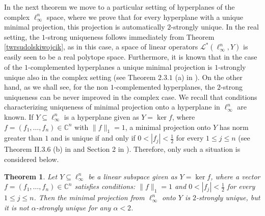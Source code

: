 \documentclass[12pt, reqno]{amsart}
\newtheorem{twr}{Theorem}[section]
\theoremstyle{definition}
\theoremstyle{remark}
\numberwithin{equation}{section}
\begin{document}
In the next theorem we move to a particular setting of hyperplanes of the complex $\ell_{\infty}^n$ space, where we prove that for every hyperplane with a unique minimal projection, this projection is automatically $2$-strongly unique. In the real setting, the $1$-strong uniqueness follows immediately from Theorem \ref{twrsudolskiwojcik}, as in this case, a space of linear operators $\mathcal{L}^* (\ell_{\infty}^n, Y)$ is easily seen to be a real polytope space. Furthermore, it is known that in the case of the $1$-complemented hyperplanes a unique minimal projection is $1$-strongly unique also in the complex setting (see Theorem $2.3.1$ (a) in \cite{lewickihabilitacja}). On the other hand, as we shall see, for the non $1$-complemented hyperplanes, the $2$-strong uniqueness can be never improved in the complex case. We recall that conditions characterizing uniqueness of minimal projection onto a hyperplane in $\ell_{\infty}^n$ are known. If $Y \subseteq \ell_{\infty}^n$ is a hyperplane given as $Y=\ker f$, where $f=(f_1, \ldots, f_n) \in \mathbb{C}^n$ with $\|f\|_1=1$, a minimal projection onto $Y$ has norm greater than $1$ and is unique if and only if $0 < |f_j| < \frac{1}{2}$ for every $1 \leq j \leq n$ (see Theorem II.3.6 (b) in \cite{odynieclewicki} and Section 2 in \cite{skrzypekoperator}). Therefore, only such a situation is considered below.

\begin{twr}
\label{twrlinfty}
Let $Y \subseteq \ell_{\infty}^n$ be a linear subspace given as $Y=\ker f$, where a vector $f=(f_1, \ldots, f_n) \in \mathbb{C}^n$ satisfies conditions: $\|f\|_1=1$ and $0 < |f_j| < \frac{1}{2}$ for every $1 \leq j \leq n$. Then the minimal projection from $\ell_{\infty}^n$ onto $Y$ is $2$-strongly unique, but it is not $\alpha$-strongly unique for any $\alpha<2$.
\end{twr}
\end{document}

